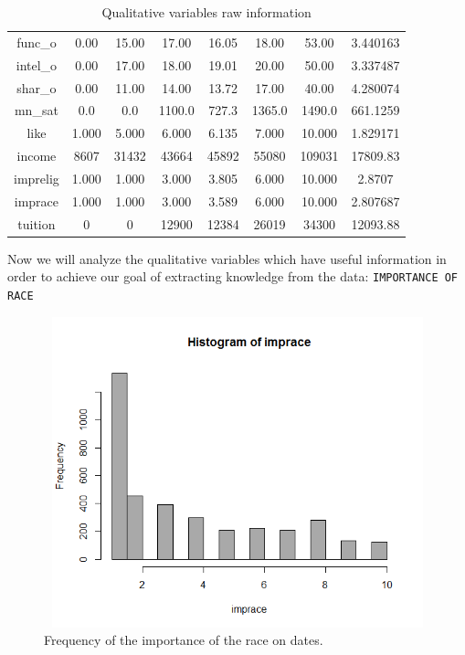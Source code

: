 \begin{table}[h!]
\begin{tabular}{||c c c c c c c c||}
 func\_o & 0.00 &  15.00 &  17.00 &  16.05 &  18.00 &  53.00 & 3.440163 \\
 intel\_o & 0.00 &  17.00 &  18.00 &  19.01  & 20.00 &  50.00 & 3.337487 \\
 shar\_o & 0.00 &  11.00 &  14.00 &  13.72 &  17.00 &  40.00 & 4.280074 \\
 mn\_sat &  0.0 & 0.0 & 1100.0 &  727.3 & 1365.0 & 1490.0 &  661.1259 \\
 like & 1.000 &  5.000 &  6.000 &  6.135 &  7.000 & 10.000 & 1.829171 \\
 income & 8607 &  31432 &  43664 &  45892 &  55080 & 109031 & 17809.83 \\
 imprelig & 1.000 &  1.000 &  3.000 &  3.805 &  6.000 & 10.000 & 2.8707 \\
 imprace & 1.000 &   1.000 &  3.000 &  3.589 &  6.000 & 10.000 & 2.807687 \\
 tuition &  0  & 0 &  12900 &  12384 &  26019 &  34300 & 12093.88 \\
 \hline
\end{tabular}
\caption{Qualitative variables raw information}
\label{table:1}
\end{table}

Now we will analyze the qualitative variables which have useful information in order to achieve our goal of extracting knowledge from the data:
\newpage
\texttt{IMPORTANCE OF RACE}

\begin{figure}
  \includegraphics[height=9cm, width=13cm]{images/Hist_Plots_Analysis/hist_imprace.png}
  \caption{Frequency of the importance of the race on dates.}
  \label{fig:imprace}
\end{figure}

